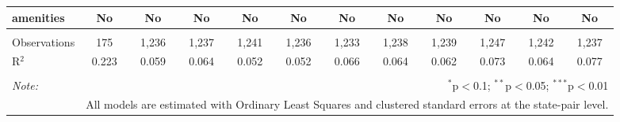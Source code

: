 \begin{table}[!htbp]
\begin{tabular}{@{\extracolsep{5pt}}lccccccccccc}
amenities & No & No & No & No & No & No & No & No & No & No & No \\ 
\hline \\[-1.8ex] 
Observations & 175 & 1,236 & 1,237 & 1,241 & 1,236 & 1,233 & 1,238 & 1,239 & 1,247 & 1,242 & 1,237 \\ 
R$^{2}$ & 0.223 & 0.059 & 0.064 & 0.052 & 0.052 & 0.066 & 0.064 & 0.062 & 0.073 & 0.064 & 0.077 \\ 
\hline 
\hline \\[-1.8ex] 
\textit{Note:}  & \multicolumn{11}{r}{$^{*}$p$<$0.1; $^{**}$p$<$0.05; $^{***}$p$<$0.01} \\ 
 & \multicolumn{11}{r}{All models are estimated with Ordinary Least Squares and clustered standard errors at the state-pair level.} \\ 
\end{tabular} 
\end{table} 
